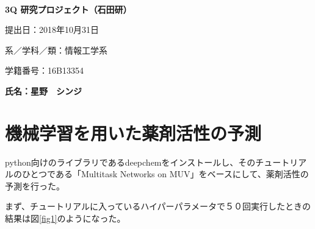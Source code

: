 \documentclass[a4j,11pt]{jarticle}
\begin{document}
\begin{center}
　\vspace{10mm}

{\bf {\huge 3Q 研究プロジェクト（石田研）}}

\vspace{80mm}

提出日：2018年10月31日

\vspace{10mm}

系／学科／類：情報工学系

\vspace{10mm}

学籍番号：16B13354

\vspace{20mm}

{\bf {\LARGE 氏名：星野　シンジ}}
\end{center}

\newpage

\section{機械学習を用いた薬剤活性の予測}

python向けのライブラリであるdeepchemをインストールし、そのチュートリアルのひとつである「Multitask Networks on MUV」をベースにして、薬剤活性の予測を行った。

まず、チュートリアルに入っているハイパーパラメータで５０回実行したときの結果は図\ref{fig1}のようになった。
\end{document}
